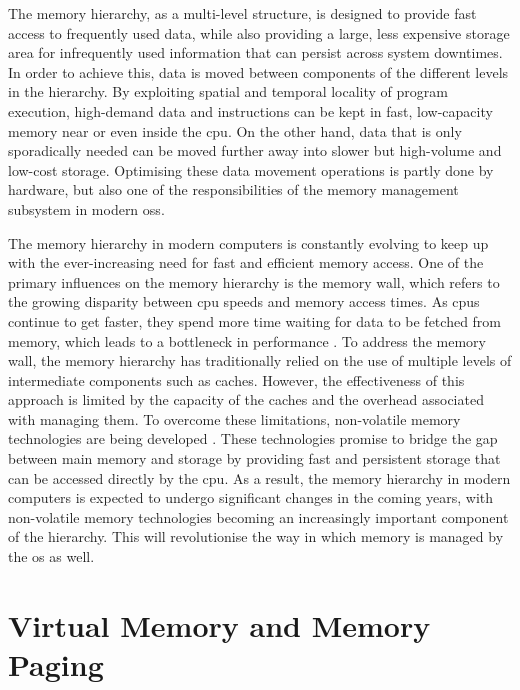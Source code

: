 The memory hierarchy, as a multi-level structure, is designed to provide fast access to frequently used data, while also providing a large, less expensive storage area for infrequently used information that can persist across system downtimes.
In order to achieve this, data is moved between components of the different levels in the hierarchy.
By exploiting spatial and temporal locality of program execution, high-demand data and instructions can be kept in fast, low-capacity memory near or even inside the \ac{cpu}.
On the other hand, data that is only sporadically needed can be moved further away into slower but high-volume and low-cost storage.
Optimising these data movement operations is partly done by hardware, but also one of the responsibilities of the memory management subsystem in modern \acp{os}.

The memory hierarchy in modern computers is constantly evolving to keep up with the ever-increasing need for fast and efficient memory access.
One of the primary influences on the memory hierarchy is the memory wall, which refers to the growing disparity between \ac{cpu} speeds and memory access times.
As \acp{cpu} continue to get faster, they spend more time waiting for data to be fetched from memory, which leads to a bottleneck in performance \cite{memory-wall1995}.
To address the memory wall, the memory hierarchy has traditionally relied on the use of multiple levels of intermediate components such as caches.
However, the effectiveness of this approach is limited by the capacity of the caches and the overhead associated with managing them.
To overcome these limitations, non-volatile memory technologies are being developed \cite{nvm2021}.
These technologies promise to bridge the gap between main memory and storage by providing fast and persistent storage that can be accessed directly by the \ac{cpu}.
As a result, the memory hierarchy in modern computers is expected to undergo significant changes in the coming years, with non-volatile memory technologies becoming an increasingly important component of the hierarchy.
This will revolutionise the way in which memory is managed by the \ac{os} as well.

\section{Virtual Memory and Memory Paging}
\label{sec:virtual-memory-memory-paging}

